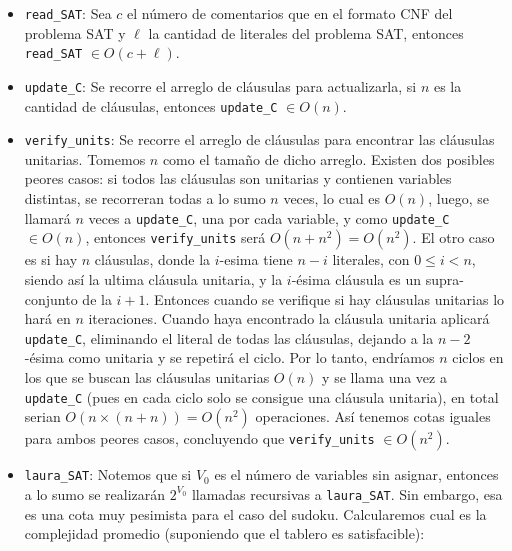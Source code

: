 \documentclass[letterpaper,12pt]{article}
\begin{document}
\begin{itemize}
	\item \texttt{read\_SAT}: Sea $c$ el número de comentarios que en el formato CNF del problema SAT y $\ell$ la cantidad de literales del problema SAT, entonces \texttt{read\_SAT} $\in O(c + \ell)$.

	\item \texttt{update\_C}: Se recorre el arreglo de cláusulas para actualizarla, si $n$ es la cantidad de cl\'ausulas, entonces \texttt{update\_C} $\in O(n)$.

	\item \texttt{verify\_units}: Se recorre el arreglo de cláusulas para encontrar las cláusulas unitarias. Tomemos $n$ como el tamaño de dicho arreglo. Existen dos posibles peores casos: si todos las cláusulas son unitarias y contienen variables distintas, se recorreran todas a lo sumo $n$ veces, lo cual es $O(n)$, luego, se llamar\'a $n$ veces a \texttt{update\_C}, una por cada variable, y como \texttt{update\_C} $\in O(n)$, entonces \texttt{verify\_units} ser\'a $O(n + n^2) = O(n^2)$. El otro caso es si hay $n$ cláusulas, donde la $i$-esima tiene $n-i$ literales, con $0 \leq i < n$, siendo así la ultima cláusula unitaria, y la $i$-\'esima cl\'ausula es un supra-conjunto de la $i+1$. Entonces cuando se verifique si hay cláusulas unitarias lo hará en $n$ iteraciones. Cuando haya encontrado la cláusula unitaria aplicará \texttt{update\_C}, eliminando el literal de todas las cl\'ausulas, dejando a la $n-2$-\'esima como unitaria y se repetir\'a el ciclo. Por lo tanto, endr\'iamos $n$ ciclos en los que se buscan las cl\'ausulas unitarias $O(n)$ y se llama una vez a \texttt{update\_C} (pues en cada ciclo solo se consigue una cl\'ausula unitaria), en total serian $O(n \times (n + n)) = O(n^2)$ operaciones. Así tenemos cotas iguales para ambos peores casos, concluyendo que \texttt{verify\_units} $\in O(n^2)$. 

	\item \texttt{laura\_SAT}: Notemos que si $V_0$ es el n\'umero de variables sin asignar, entonces a lo sumo se realizar\'an $2^{V_0}$ llamadas recursivas a \texttt{laura\_SAT}. Sin embargo, esa es una cota muy pesimista para el caso del sudoku. Calcularemos cual es la complejidad promedio (suponiendo que el tablero es satisfacible): \\
			

\end{itemize}
\end{document}
